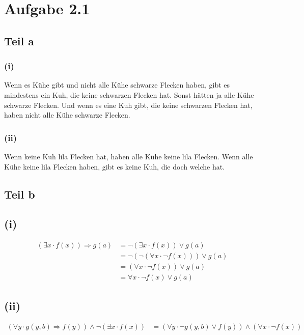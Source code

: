 \documentclass[10pt,a4paper]{article}
\begin{document}
\section{Aufgabe 2.1}

\subsection{Teil a}

\subsubsection{(i)}

Wenn es Kühe gibt und nicht alle Kühe schwarze Flecken haben, gibt es mindestens ein Kuh, die keine schwarzen Flecken hat.
Sonst hätten ja alle Kühe schwarze Flecken.
Und wenn es eine Kuh gibt, die keine schwarzen Flecken hat, haben nicht alle Kühe schwarze Flecken.

\subsubsection{(ii)}

Wenn keine Kuh lila Flecken hat, haben alle Kühe keine lila Flecken.
Wenn alle Kühe keine lila Flecken haben, gibt es keine Kuh, die doch welche hat.

\subsection{Teil b}

\subsection{(i)}

\begin{align*}
  (\exists x \cdot f(x)) \Rightarrow g(a) & = \neg(\exists x \cdot f(x)) \lor g(a)\\
  & = \neg(\neg(\forall x \cdot \neg f(x))) \lor g(a)\\
  & = (\forall x \cdot \neg f(x)) \lor g(a)\\
  & = \forall x \cdot \neg f(x) \lor g(a)
\end{align*}

\subsection{(ii)}

\begin{align*}
(\forall y \cdot g(y, b) \Rightarrow f(y)) \land \neg(\exists x \cdot f(x)) & = (\forall y \cdot \neg g(y, b) \lor f(y)) \land (\forall x \cdot \neg f(x))
\end{align*}
\end{document}
